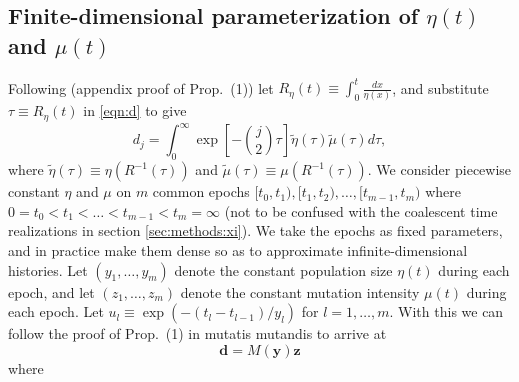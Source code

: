 \documentclass[11pt]{article}
\begin{document}
\subsection{Finite-dimensional parameterization of $\eta(t)$ and $\mu(t)$}\label{sec:methods:pcsws}


Following \cite{Rosen2018-bb} (appendix proof of Prop.\ (1)) let $R_\eta(t) \equiv \int_0^t\frac{dx}{\eta(x)}$, and substitute $\tau \equiv R_\eta(t)$ in \eqref{eqn:d} to give
\begin{equation}
\label{eqn:d2}
d_j = \int_0^\infty \exp\left[-\binom{j}{2}\tau\right] \tilde\eta(\tau)\tilde\mu(\tau)d\tau,
\end{equation}
where $\tilde\eta(\tau) \equiv \eta(R^{-1}(\tau))$ and $\tilde\mu(\tau) \equiv \mu(R^{-1}(\tau))$.
We consider piecewise constant $\eta$ and $\mu$ on $m$ common epochs $[t_0, t_1), [t_1, t_2),\dots, [t_{m-1}, t_m)$ where $0=t_0 < t_1 < \dots < t_{m-1} < t_m=\infty$ (not to be confused with the coalescent time realizations in section \ref{sec:methods:xi}).
We take the epochs as fixed parameters, and in practice make them dense so as to approximate infinite-dimensional histories.
Let $(y_1,\dots,y_m)$ denote the constant population size $\eta(t)$ during each epoch, and let $(z_1,\dots,z_m)$ denote the constant mutation intensity $\mu(t)$ during each epoch.
Let $u_l \equiv \exp(-(t_l-t_{l-1})/y_l)$ for $l=1,\dots,m$. %
With this we can follow the proof of Prop.\ (1) in \cite{Rosen2018-bb} mutatis mutandis to arrive at
\begin{equation}
\label{eqn:d3}
\boldsymbol d = M(\boldsymbol y) \boldsymbol z
\end{equation}
where
\end{document}
